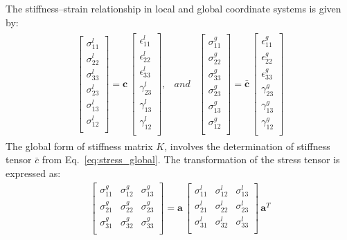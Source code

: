 \documentclass[materials,article,submit,moreauthors,pdftex]{Definitions/mdpi}
\begin{document}
The stiffness--strain relationship in local and global coordinate systems is given by:
\begin{eqnarray}
\begin{array}{ccc}
\left [
\begin{array}{c}
\sigma^l_{11}\\
\sigma^l_{22}\\ 
\sigma^l_{33}\\ 
\sigma^l_{23}\\
\sigma^l_{13}\\
\sigma^l_{12}\\
\end{array}
\right ]=
\textbf{c}\,\left [
\begin{array}{c}
\epsilon^l_{11}\\
\epsilon^l_{22}\\ 
\epsilon^l_{33}\\
\gamma^l_{23}\\
\gamma^l_{13}\\
\gamma^l_{12}\\
\end{array}
\right ], & and &
\left [
\begin{array}{c}
\sigma^g_{11}\\
\sigma^g_{22}\\ 
\sigma^g_{33}\\ 
\sigma^g_{23}\\
\sigma^g_{13}\\
\sigma^g_{12}\\
\end{array}
\right ]=
\bar{\textbf{c}}\,\left [
\begin{array}{c}
\epsilon^g_{11}\\
\epsilon^g_{22}\\ 
\epsilon^g_{33}\\
\gamma^g_{23}\\
\gamma^g_{13}\\
\gamma^g_{12}\\
\end{array}
\right ]
\end{array}
\label{eq:stress_global}
\end{eqnarray}
The global form of stiffness matrix \(K\), involves the determination of stiffness tensor \(\bar{c}\) from Eq.~\ref{eq:stress_global}.
The transformation of the stress tensor is expressed as:
\begin{eqnarray}
\left [ 
\begin{array}{ccc}
\sigma^g_{11} & \sigma^g_{12} & \sigma^g_{13}\\
\sigma^g_{21} & \sigma^g_{22} & \sigma^g_{23}\\
\sigma^g_{31} & \sigma^g_{32} & \sigma^g_{33}\\
\end{array}
\right ]
=
\textbf{a}\,
\left [ 
\begin{array}{ccc}
\sigma^l_{11} & \sigma^l_{12} & \sigma^l_{13}\\
\sigma^l_{21} & \sigma^l_{22} & \sigma^l_{23}\\
\sigma^l_{31} & \sigma^l_{32} & \sigma^l_{33}\\
\end{array}
\right ]
\,\textbf{a}^T
\label{eq:sigma_tensor}
\end{eqnarray}
\end{document}
